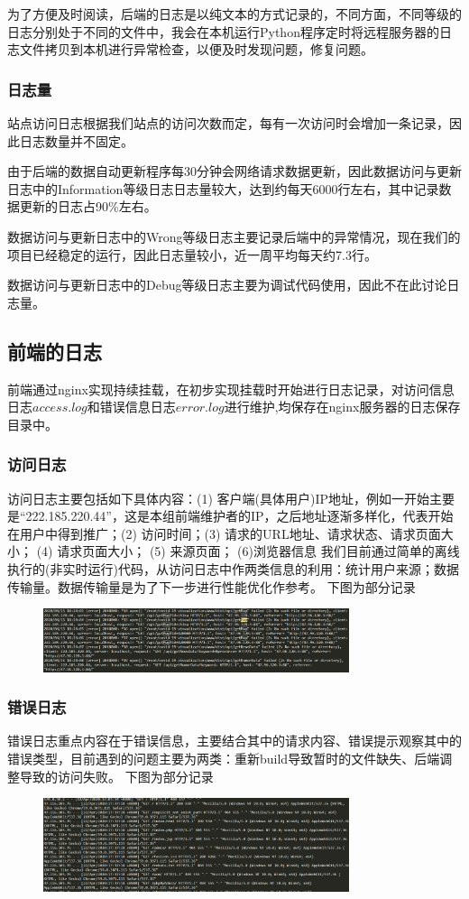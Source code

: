 \documentclass{article}
\begin{document}
为了方便及时阅读，后端的日志是以纯文本的方式记录的，不同方面，不同等级的日志分别处于不同的文件中，我会在本机运行Python程序定时将远程服务器的日志文件拷贝到本机进行异常检查，以便及时发现问题，修复问题。


\subsubsection{日志量}

站点访问日志根据我们站点的访问次数而定，每有一次访问时会增加一条记录，因此日志数量并不固定。

由于后端的数据自动更新程序每30分钟会网络请求数据更新，因此数据访问与更新日志中的Information等级日志日志量较大，达到约每天6000行左右，其中记录数据更新的日志占90\%左右。

数据访问与更新日志中的Wrong等级日志主要记录后端中的异常情况，现在我们的项目已经稳定的运行，因此日志量较小，近一周平均每天约7.3行。

数据访问与更新日志中的Debug等级日志主要为调试代码使用，因此不在此讨论日志量。

\subsection{前端的日志}
前端通过nginx实现持续挂载，在初步实现挂载时开始进行日志记录，对访问信息日志$access.log$和错误信息日志$error.log$进行维护,均保存在nginx服务器的日志保存目录中。
\subsubsection{访问日志}
访问日志主要包括如下具体内容：(1) 客户端(具体用户)IP地址，例如一开始主要是“222.185.220.44”，这是本组前端维护者的IP，之后地址逐渐多样化，代表开始在用户中得到推广；(2) 访问时间；(3) 请求的URL地址、请求状态、请求页面大小； (4) 请求页面大小； (5) 来源页面； (6)浏览器信息
我们目前通过简单的离线执行的(非实时运行)代码，从访问日志中作两类信息的利用：统计用户来源；数据传输量。数据传输量是为了下一步进行性能优化作参考。
下图为部分记录
\begin{figure}[H]
\centering
\includegraphics[width=0.8\textwidth]{access.png}
\end{figure}
\subsubsection{错误日志}
错误日志重点内容在于错误信息，主要结合其中的请求内容、错误提示观察其中的错误类型，目前遇到的问题主要为两类：重新build导致暂时的文件缺失、后端调整导致的访问失败。
下图为部分记录
\begin{figure}[H]
\centering
\includegraphics[width=0.8\textwidth]{error.png}
\end{figure}
\end{document}
